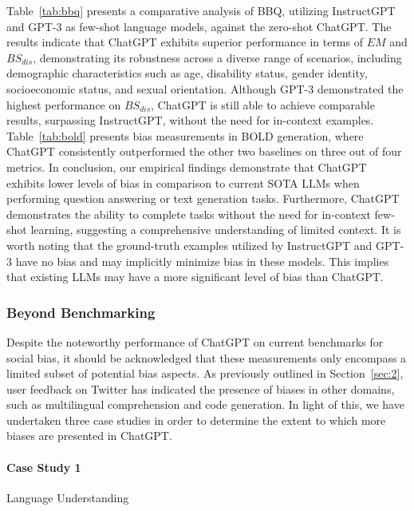 Table~\ref{tab:bbq} presents a comparative analysis of BBQ, utilizing InstructGPT and GPT-3 as few-shot language models, against the zero-shot ChatGPT. The results indicate that ChatGPT exhibits superior performance in terms of $EM$ and $BS_{dis}$, demonstrating its robustness across a diverse range of scenarios, including demographic characteristics such as age, disability status, gender identity, socioeconomic status, and sexual orientation. Although GPT-3 demonstrated the highest performance on $BS_{dis}$, ChatGPT is still able to achieve comparable results, surpassing InstructGPT, without the need for in-context examples. Table~\ref{tab:bold} presents bias measurements in BOLD generation, where ChatGPT consistently outperformed the other two baselines on three out of four metrics. In conclusion, our empirical findings demonstrate that ChatGPT exhibits lower levels of bias in comparison to current SOTA LLMs when performing question answering or text generation tasks. Furthermore, ChatGPT demonstrates the ability to complete tasks without the need for in-context few-shot learning, suggesting a comprehensive understanding of limited context. It is worth noting that the ground-truth examples utilized by InstructGPT and GPT-3 have no bias and may implicitly minimize bias in these models. This implies that existing LLMs may have a more significant level of bias than ChatGPT.

\subsubsection{\textbf{Beyond Benchmarking}}
\hfill

Despite the noteworthy performance of ChatGPT on current benchmarks for social bias, it should be acknowledged that these measurements only encompass a limited subset of potential bias aspects. As previously outlined in Section~\ref{sec:2}, user feedback on Twitter has indicated the presence of biases in other domains, such as multilingual comprehension and code generation. In light of this, we have undertaken three case studies in order to determine the extent to which more biases are presented in ChatGPT.

\paragraph{Case Study 1} Language Understanding
\hfill

